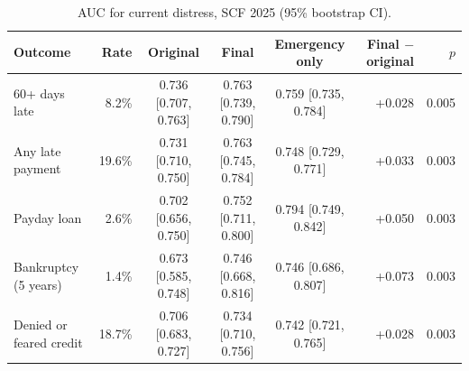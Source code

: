 \begin{table}[htbp]
\centering
\small
\caption{AUC for current distress, SCF 2025 (95\% bootstrap CI).}
\label{tab:aucnow}
\begin{tabular}{lrcccrr}
\toprule
Outcome & Rate & Original & Final & Emergency only & Final $-$ original & $p$ \\
\midrule
60+ days late & 8.2\% & 0.736 [0.707, 0.763] & 0.763 [0.739, 0.790] & 0.759 [0.735, 0.784] & +0.028 & 0.005 \\
Any late payment & 19.6\% & 0.731 [0.710, 0.750] & 0.763 [0.745, 0.784] & 0.748 [0.729, 0.771] & +0.033 & 0.003 \\
Payday loan & 2.6\% & 0.702 [0.656, 0.750] & 0.752 [0.711, 0.800] & 0.794 [0.749, 0.842] & +0.050 & 0.003 \\
Bankruptcy (5 years) & 1.4\% & 0.673 [0.585, 0.748] & 0.746 [0.668, 0.816] & 0.746 [0.686, 0.807] & +0.073 & 0.003 \\
Denied or feared credit & 18.7\% & 0.706 [0.683, 0.727] & 0.734 [0.710, 0.756] & 0.742 [0.721, 0.765] & +0.028 & 0.003 \\
\bottomrule
\end{tabular}
\end{table}
